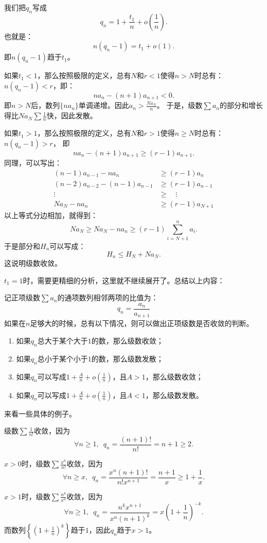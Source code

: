 \documentclass[12pt,UTF8]{ctexbook}
\newcommand{\olim}[1]{\mathit{o}\left(#1\right)}  %
\theoremstyle{definition}
\theoremstyle{plain}
\begin{document}
我们把$q_n$写成
$$ q_n = 1 + \frac{t_1}{n} + \olim{\frac{1}{n}}. $$
也就是：
$$ n(q_n - 1) = t_1 + \olim{1}.$$
即$n(q_n - 1)$趋于$t_1$。

如果$t_1 < 1$，那么按照极限的定义，总有$N$和$r<1$使得$n>N$时总有：$n(q_n - 1) < r$，即：
$$ na_n - (n+1)a_{n+1} < 0. $$
即$n>N$后，数列$\{na_n\}$单调递增。因此$a_n > \frac{Na_N}{n}$。
于是，级数$\sum a_n$的部分和增长得比$Na_N\sum \frac{1}{n}$快，因此发散。

如果$t_1 > 1$，那么按照极限的定义，总有$N$和$r>1$使得$n\geqslant N$时总有：$n(q_n - 1) > r$，
即
$$ na_n - (n+1)a_{n+1} \geqslant (r - 1)a_{n+1}.  $$
同理，可以写出：
\begin{align*}
    (n-1)a_{n-1} - na_n &\geqslant (r - 1)a_{n}  \\
    (n-2)a_{n-2} - (n-1)a_{n-1} &\geqslant (r - 1)a_{n-1}  \\
    \vdots \quad &\geqslant \quad \vdots  \\
    Na_{N} - na_n &\geqslant (r - 1)a_{N+1} 
\end{align*}
以上等式分边相加，就得到：
$$ Na_{N} \geqslant Na_{N} - na_n \geqslant (r - 1)\sum_{i=N+1}^n a_i. $$
于是部分和$H_n$可以写成：
$$ H_n \leqslant H_N + Na_{N}.$$
这说明级数收敛。

$t_1 = 1$时，需要更精细的分析，这里就不继续展开了。总结以上内容：

记正项级数$\sum a_n$的通项数列相邻两项的比值为：
$$ q_n = \frac{a_n}{a_{n+1}} $$
如果在$n$足够大的时候，总有以下情况，则可以做出正项级数是否收敛的判断。
\begin{enumerate}
    \item 如果$q_n$总大于某个大于$1$的数，那么级数收敛；
    \item 如果$q_n$总小于某个小于$1$的数，那么级数发散；
    \item 如果$q_n$可以写成$1 + \frac{A}{n} + \olim{\frac{1}{n}}$，且$A > 1$，那么级数收敛；
    \item 如果$q_n$可以写成$1 + \frac{A}{n} + \olim{\frac{1}{n}}$，且$A < 1$，那么级数发散。
\end{enumerate}

来看一些具体的例子。

级数$\sum \frac{1}{n!}$收敛，因为
$$\forall n \geqslant 1,  \,\,\,q_n = \frac{(n+1)!}{n!} = n+1 \geqslant 2. $$

$x>0$时，级数$\sum \frac{x^n}{n!}$收敛，因为
$$\forall n \geqslant x,  \,\,\,q_n = \frac{x^n (n+1)!}{n! x^{n+1}} = \frac{n+1}{x} \geqslant 1 + \frac{1}{x}. $$

$x>1$时，级数$\sum \frac{n^k}{x^n}$收敛，因为
$$\forall n \geqslant 1,  \,\,\,q_n = \frac{n^k x^{n+1}}{x^n (n+1)^{k}} = x\left(1 + \frac{1}{n}\right)^{-k}. $$
而数列$\left\{\left(1 + \frac{1}{n}\right)^k\right\}$趋于$1$，因此$q_n$趋于$x>1$。
\end{document}
